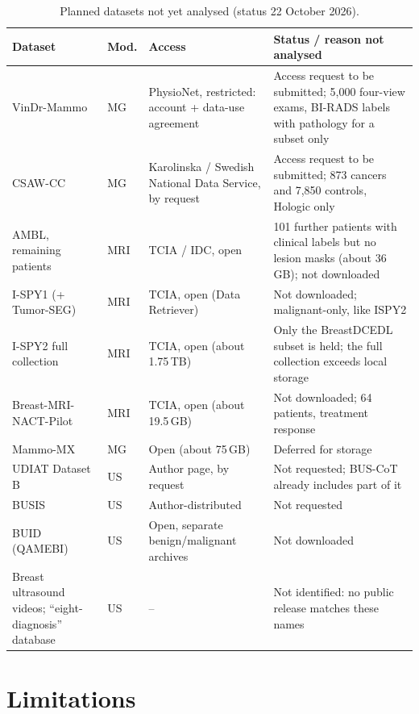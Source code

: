 \documentclass[11pt]{article}
\begin{document}
\begin{table}[!htbp]
  \centering
  \footnotesize
  \caption{Planned datasets not yet analysed (status 22 October 2026).}
  \label{tab:planned}
  \begin{tabularx}{\textwidth}{@{}l l Y Y@{}}
    \toprule
    Dataset & Mod. & Access & Status / reason not analysed \\
    \midrule
    VinDr-Mammo & MG & PhysioNet, restricted: account + data-use agreement & Access request to be submitted; 5,000 four-view exams, BI-RADS labels with pathology for a subset only \\
    CSAW-CC & MG & Karolinska / Swedish National Data Service, by request & Access request to be submitted; 873 cancers and 7,850 controls, Hologic only \\
    AMBL, remaining patients & MRI & TCIA / IDC, open & 101 further patients with clinical labels but no lesion masks (about 36\,GB); not downloaded \\
    I-SPY1 (+ Tumor-SEG) & MRI & TCIA, open (Data Retriever) & Not downloaded; malignant-only, like ISPY2 \\
    I-SPY2 full collection & MRI & TCIA, open (about 1.75\,TB) & Only the BreastDCEDL subset is held; the full collection exceeds local storage \\
    Breast-MRI-NACT-Pilot & MRI & TCIA, open (about 19.5\,GB) & Not downloaded; 64 patients, treatment response \\
    Mammo-MX & MG & Open (about 75\,GB) & Deferred for storage \\
    UDIAT Dataset B & US & Author page, by request & Not requested; BUS-CoT already includes part of it \\
    BUSIS & US & Author-distributed & Not requested \\
    BUID (QAMEBI) & US & Open, separate benign/malignant archives & Not downloaded \\
    Breast ultrasound videos; ``eight-diagnosis'' database & US & -- & Not identified: no public release matches these names \\
    \bottomrule
  \end{tabularx}
\end{table}

\section{Limitations}
\end{document}
